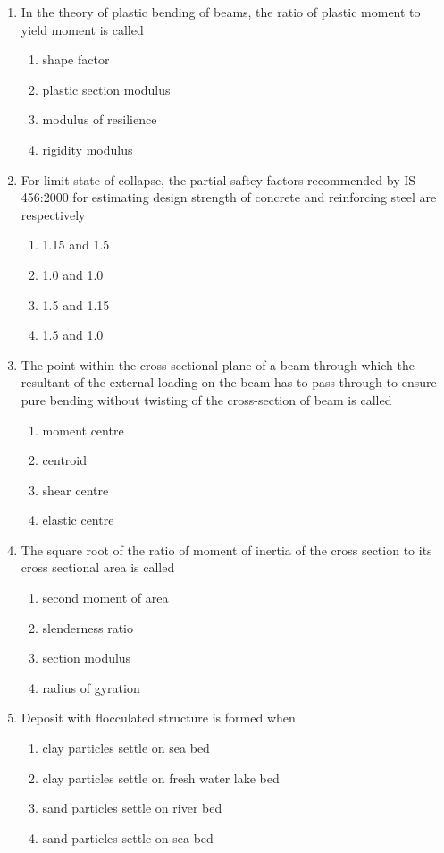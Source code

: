 \documentclass[journal,12pt,twocolumn]{IEEEtran}
\theoremstyle{remark}
\begin{document}
\begin{enumerate}
\item In the theory of plastic bending of beams, the ratio of plastic moment to yield moment is called
	\begin{enumerate}
		\item shape factor
		\item plastic section modulus
		\item modulus of resilience
		\item rigidity modulus
	\end{enumerate}

\item For limit state of collapse, the partial saftey factors recommended by IS 456:2000 for estimating design strength of concrete and reinforcing steel are respectively
	\begin{enumerate}
		\item 1.15 and 1.5
		\item 1.0 and 1.0
		\item 1.5 and 1.15
		\item 1.5 and 1.0
	\end{enumerate}




\item The point within the cross sectional plane of a beam through which the resultant of the external loading on the beam has to pass through to ensure pure bending without twisting of the cross-section of beam is called
	\begin{enumerate}
		\item moment centre
		\item centroid
		\item shear centre
		\item elastic centre
	\end{enumerate}

\item The square root of the ratio of moment of inertia of the cross section to its cross sectional area is called
	\begin{enumerate}
		\item second moment of area
		\item slenderness ratio
		\item section modulus
		\item radius of gyration
	\end{enumerate}

\item Deposit with flocculated structure is formed when
	\begin{enumerate}
		\item clay particles settle on sea bed
		\item clay particles settle on fresh water lake bed
		\item sand particles settle on river bed
		\item sand particles settle on sea bed
        \end{enumerate}


\end{enumerate}
\end{document}
